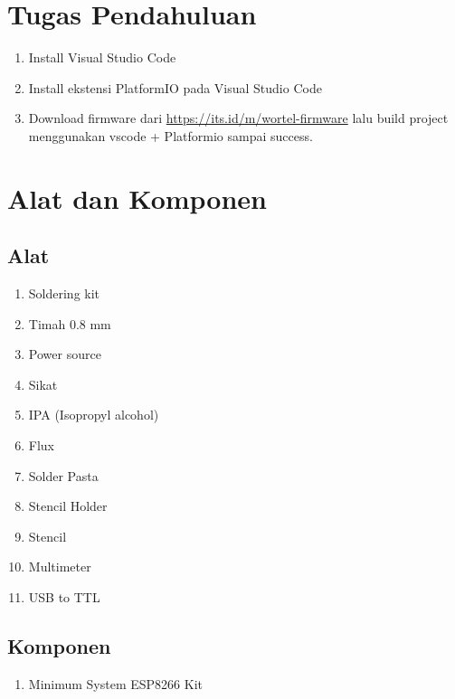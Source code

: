 \section{Tugas Pendahuluan}
\begin{enumerate}
    \item Install Visual Studio Code 
    \item Install ekstensi PlatformIO pada Visual Studio Code 
    \item Download firmware dari \url{https://its.id/m/wortel-firmware} lalu build project menggunakan vscode + Platformio sampai success.
\end{enumerate}

\section{Alat dan Komponen}
\subsection{Alat}
\begin{enumerate}
    \item Soldering kit
    \item Timah 0.8 mm
    \item Power source
    \item Sikat 
    \item IPA (Isopropyl alcohol)
    \item Flux
    \item Solder Pasta
    \item Stencil Holder
    \item Stencil
    \item Multimeter
    \item USB to TTL
\end{enumerate}

\subsection{Komponen}
\begin{enumerate}
    \item Minimum System ESP8266 Kit
\end{enumerate}

